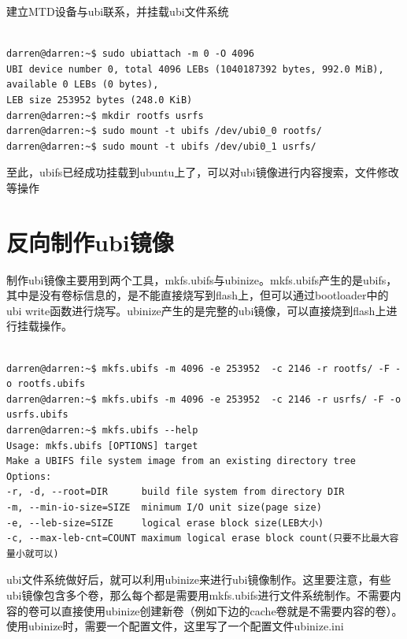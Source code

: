 \noindent 建立MTD设备与ubi联系，并挂载ubi文件系统
\begin{mdframed}[backgroundcolor=ubuntured,fontcolor=white,hidealllines=true]
\begin{verbatim}

darren@darren:~$ sudo ubiattach -m 0 -O 4096
UBI device number 0, total 4096 LEBs (1040187392 bytes, 992.0 MiB), available 0 LEBs (0 bytes), 
LEB size 253952 bytes (248.0 KiB)
darren@darren:~$ mkdir rootfs usrfs
darren@darren:~$ sudo mount -t ubifs /dev/ubi0_0 rootfs/
darren@darren:~$ sudo mount -t ubifs /dev/ubi0_1 usrfs/

\end{verbatim}
\end{mdframed}
至此，ubifs已经成功挂载到ubuntu上了，可以对ubi镜像进行内容搜索，文件修改等操作

\section{反向制作ubi镜像}
制作ubi镜像主要用到两个工具，mkfs.ubifs与ubinize。mkfs.ubifs产生的是ubifs，其中是没有卷标信息的，是不能直接烧写到flash上，但可以通过bootloader中的ubi write函数进行烧写。ubinize产生的是完整的ubi镜像，可以直接烧到flash上进行挂载操作。
\begin{mdframed}[backgroundcolor=ubuntured,fontcolor=white,hidealllines=true]
\begin{verbatim}

darren@darren:~$ mkfs.ubifs -m 4096 -e 253952  -c 2146 -r rootfs/ -F -o rootfs.ubifs
darren@darren:~$ mkfs.ubifs -m 4096 -e 253952  -c 2146 -r usrfs/ -F -o usrfs.ubifs
darren@darren:~$ mkfs.ubifs --help
Usage: mkfs.ubifs [OPTIONS] target
Make a UBIFS file system image from an existing directory tree
Options:
-r, -d, --root=DIR      build file system from directory DIR
-m, --min-io-size=SIZE  minimum I/O unit size(page size)
-e, --leb-size=SIZE     logical erase block size(LEB大小)
-c, --max-leb-cnt=COUNT maximum logical erase block count(只要不比最大容量小就可以)

\end{verbatim}
\end{mdframed}
ubi文件系统做好后，就可以利用ubinize来进行ubi镜像制作。这里要注意，有些ubi镜像包含多个卷，那么每个都是需要用mkfs.ubifs进行文件系统制作。不需要内容的卷可以直接使用ubinize创建新卷（例如下边的cache卷就是不需要内容的卷）。使用ubinize时，需要一个配置文件，这里写了一个配置文件ubinize.ini
